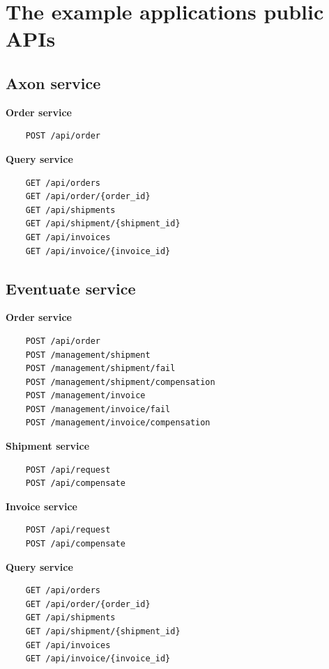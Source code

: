 \documentclass[oneside,
  digital, %
  table,   %
  nolof,     %
  nolot,     %
]{fithesis3}
\begin{document}
\clearpage
\chapter{The example applications public APIs}
\label{sec:appendixAPI}

\section{Axon service}

\textbf{Order service}

\begin{verbatim}
    POST /api/order
\end{verbatim}

\noindent
\textbf{Query service}

\begin{verbatim}
    GET /api/orders
    GET /api/order/{order_id}
    GET /api/shipments
    GET /api/shipment/{shipment_id}
    GET /api/invoices
    GET /api/invoice/{invoice_id}
\end{verbatim}

\section{Eventuate service}

\textbf{Order service}

\begin{verbatim}
    POST /api/order
    POST /management/shipment
    POST /management/shipment/fail
    POST /management/shipment/compensation
    POST /management/invoice
    POST /management/invoice/fail
    POST /management/invoice/compensation
\end{verbatim}

\noindent
\textbf{Shipment service}

\begin{verbatim}
    POST /api/request
    POST /api/compensate
\end{verbatim}

\noindent
\textbf{Invoice service}

\begin{verbatim}
    POST /api/request
    POST /api/compensate
\end{verbatim}

\noindent
\textbf{Query service}

\begin{verbatim}
    GET /api/orders
    GET /api/order/{order_id}
    GET /api/shipments
    GET /api/shipment/{shipment_id}
    GET /api/invoices
    GET /api/invoice/{invoice_id}
\end{verbatim}
\end{document}
